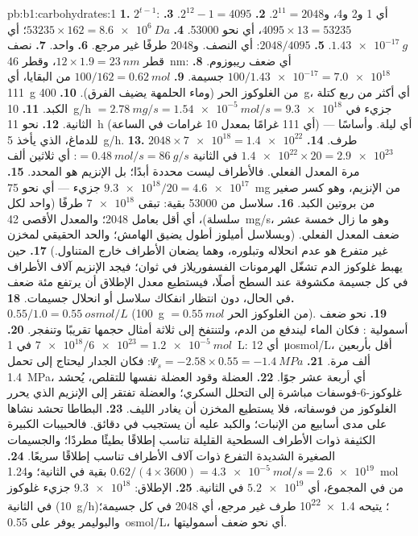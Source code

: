 \begin{solution}{pb:b1:carbohydrates:1}
\textbf{1.} $2^{t-1}$: أي 1 و2 و4، و$2^{11} = 2048$.
\textbf{2.} $2^{12} - 1 = 4095$.
\textbf{3.} $4095\times 13 = \num{53235}$، أي نحو \num{53000}.
\textbf{4.} $\num{53235}\times 162 = \qty{8.6e6}{Da}$؛ أي
$\qty{1.43e-17}{g}$.
\textbf{5.} $2048/4095$: أي النصف. و\num{2048} طرفًا غير مرجع.
\textbf{6.} واحد.
\textbf{7.} نصف قطر $12\times 1.9 = \qty{23}{nm}$، وقطر
\qty{46}{nm}: أي ضعف ريبوزوم.
\textbf{8.} $100/\num{1.43e-17} = \num{7.0e18}$ جسيمة.
\textbf{9.} $100/162 = \qty{0.62}{mol}$ من البقايا، أي \qty{111}{g}
من الغلوكوز الحر (وماء الحلمهة يضيف الفرق).
\textbf{10.} \qty{400}{g}، أي أكثر من ربع كتلة الكبد.
\textbf{11.} \qty{10}{g/h} $= \qty{2.78}{mg/s} = \qty{1.54e-5}{mol/s} =
\num{9.3e18}$ جزيء في الثانية.
\textbf{12.} نحو \qty{11}{h} (أي 111 غرامًا بمعدل 10 غرامات في
الساعة) --- أي ليلة. وأساسًا للدماغ، الذي يأخذ \qty{5}{g/h}.
\textbf{13.} $2048\times\num{7e18} = \num{1.4e22}$ طرف.
\textbf{14.} $\num{1.4e22}\times 20 = \num{2.9e23}$ في الثانية $=
\qty{0.48}{mol/s} = \qty{86}{g/s}$: أي ثلاثين ألف مرة المعدل الفعلي.
فالأطراف ليست محددة أبدًا؛ بل الإنزيم هو المحدد.
\textbf{15.} $\num{9.3e18}/20 = \num{4.6e17}$ جزيء --- أي نحو
\qty{75}{mg} من الإنزيم، وهو كسر صغير من بروتين الكبد.
\textbf{16.} سلاسل من \num{53000} بقية: تبقى $\num{7e18}$ طرفًا
(واحد لكل سلسلة)، أي أقل بعامل \num{2048}؛ والمعدل الأقصى
\qty{42}{mg/s}، وهو ما زال خمسة عشر ضعف المعدل الفعلي. (وبسلاسل
أميلوز أطول يضيق الهامش؛ والحد الحقيقي لمخزن غير متفرع هو عدم
انحلاله وتبلوره، وهما يضعان الأطراف خارج المتناول.)
\textbf{17.} حين يهبط غلوكوز الدم تشغّل الهرمونات الفسفوريلاز في
ثوان؛ فيجد الإنزيم آلاف الأطراف في كل جسيمة مكشوفة عند السطح أصلًا،
فيستطيع معدل الإطلاق أن يرتفع مئة ضعف في الحال، دون انتظار انفكاك
سلاسل أو انحلال جسيمات.
\textbf{18.} $0.55/1.0 = \qty{0.55}{osmol/L}$ (\qty{100}{g}
$= \qty{0.55}{mol}$ من الغلوكوز الحر).
\textbf{19.} نحو ضعف أسمولية : فكان الماء ليندفع من
الدم، ولتنتفخ  إلى ثلاثة أمثال حجمها تقريبًا وتنفجر.
\textbf{20.} $\num{7e18}/\num{6e23} = \qty{1.2e-5}{mol}$ في
\qty{1}{L}: أي \qty{12}{\micro osmol/L}، أقل بأربعين ألف مرة.
\textbf{21.} $\Psi_s = -2.58\times 0.55 = \qty{-1.4}{MPa}$: فكان
الجدار ليحتاج إلى تحمل \qty{1.4}{MPa}، أي أربعة عشر جوًا.
\textbf{22.}  العضلة وقود العضلة نفسها للتقلص، يُحشد
غلوكوز-6-فوسفات مباشرة إلى التحلل السكري؛ والعضلة تفتقر إلى الإنزيم
الذي يحرر الغلوكوز من فوسفاته، فلا يستطيع المخزن أن يغادر الليف.
\textbf{23.} البطاطا تحشد نشاها على مدى أسابيع من الإنبات؛ والكبد
عليه أن يستجيب في دقائق. فالحبيبات الكبيرة الكثيفة ذوات الأطراف
السطحية القليلة تناسب إطلاقًا بطيئًا مطردًا؛ والجسيمات الصغيرة الشديدة
التفرع ذوات آلاف الأطراف تناسب إطلاقًا سريعًا.
\textbf{24.} $0.62/(4\times 3600) = \qty{4.3e-5}{mol/s} = \num{2.6e19}$
بقية في الثانية؛ و\qty{1.24}{mol} من  في المجموع، أي
$\num{5.2e19}$ في الثانية.
\textbf{25.} الإطلاق: $\num{9.3e18}$ جزيء غلوكوز في الثانية
(\qty{10}{g/h})؛ يتيحه \num{1.4e22} طرف غير مرجع، أي \num{2048} في
كل جسيمة؛ والبوليمر يوفر على  \qty{0.55}{osmol/L}، أي نحو
ضعف أسموليتها.
\end{solution}
